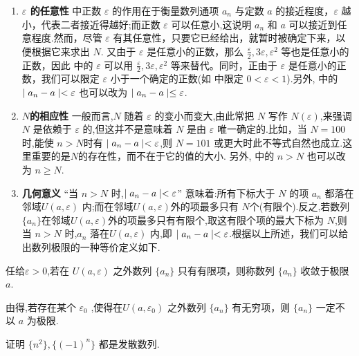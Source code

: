 \begin{enumerate}
    \item \textbf{$\varepsilon$ 的任意性}\quad  {} 中正数 $\varepsilon$ 的作用在于衡量数列通项 $a_n$ 与定数 $a$ 的接近程度，$\varepsilon$ 越小，代表二者接近得越好;而正数 $\varepsilon$ 可以任意小,这说明 $a_n$ 和 $a$ 可以接近到任意程度.然而，尽管 $\varepsilon$ 有其任意性，只要它已经给出，就暂时被确定下来，以便根据它来求出 $N$. 又由于 $\varepsilon$ 是任意小的正数，那么 $\frac{\varepsilon}{2},3\varepsilon,\varepsilon^2$ 等也是任意小的正数，因此  中的 $\varepsilon$ 可以用 $\frac{\varepsilon}{2},3\varepsilon,\varepsilon^2$ 等来替代。同时，正由于 $\varepsilon$ 是任意小的正数，我们可以限定 $\varepsilon$ 小于一个确定的正数(如 中限定 $0<\varepsilon<1$).另外,  中的 $\mid a_n-a \mid<\varepsilon$ 也可以改为 $\mid a_n-a \mid\le \varepsilon$.
    \item \textbf{$N$的相应性} \quad 一般而言,$N$ 随着 $\varepsilon$ 的变小而变大,由此常把 $N$ 写作 $N(\varepsilon)$,来强调 $N$ 是依赖于 $\varepsilon$ 的,但这并不是意味着 $N$ 是由 $\varepsilon$ 唯一确定的.比如，当 $N=100$ 时,能使 $n>N$时有 $\mid a_n-a \mid<\varepsilon$,则 $N=101$ 或更大时此不等式自然也成立.这里重要的是$N$的存在性，而不在于它的值的大小. 另外, 中的 $n>N$ 也可以改为 $n\ge N$.
    \item \textbf{几何意义} \quad “当 $n>N$ 时,$\mid a_n-a \mid<\varepsilon$” 意味着:所有下标大于 $N$ 的项 $a_n$ 都落在邻域$U(a,\varepsilon)$ 内;而在邻域$U(a,\varepsilon)$外的项最多只有 $N$个(有限个).反之,若数列 $\{a_n\}$在邻域$U(a,\varepsilon)$外的项最多只有有限个,取这有限个项的最大下标为 $N$,则当 $n>N$ 时,$a_n$ 落在$U(a,\varepsilon)$ 内,即 $\mid a_n-a \mid<\varepsilon$.根据以上所述，我们可以给出数列极限的一种等价定义如下.
\end{enumerate}

\begin{definition}[极限的邻域定义]\label{def:ujixian}
    任给$\varepsilon>0$,若在 $U(a,\varepsilon)$ 之外数列 $\{a_n\}$ 只有有限项，则称数列 $\{a_n\}$ 收敛于极限 $a$.
\end{definition}

由得,若存在某个 $\varepsilon_0$ ,使得在$U(a,\varepsilon_0)$ 之外数列 $\{a_n\}$ 有无穷项，则 $\{a_n\}$ 一定不以 $a$ 为极限.

\begin{example}\label{ex:fasan}
    证明 $\{n^2\},\{(-1)^n\}$ 都是发散数列.
\end{example}

